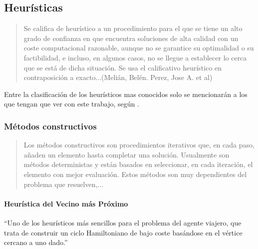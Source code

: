 \subsection{Heurísticas}  %
\begin{quote}Se califica de heurístico a un procedimiento para el que se tiene un alto grado de confianza en que encuentra soluciones de alta calidad con un coste computacional razonable, aunque no se garantice su optimalidad o su factibilidad, e incluso, en algunos casos, no se llegue a establecer lo cerca que se está de dicha situación. Se usa el calificativo heurístico en contraposición a exacto...(Melián, Belén. Perez, Jose A. et al) \cite{RiojasCanari2005BusquedaN-reinas}\end{quote}

Entre la clasificación de los heurísticos mas conocidos solo se mencionarán a los que tengan que ver con este trabajo, según .
\subsubsection{Métodos constructivos}
\begin{quote}Los métodos constructivos son procedimientos iterativos que, en cada paso, añaden un elemento hasta completar una solución. Usualmente son métodos deterministas y están basados en seleccionar, en cada iteración, el elemento con mejor evaluación. Estos métodos son muy dependientes del problema que resuelven,... \cite{MartiProcedimientosCombinatoria}\end{quote}
\paragraph{Heurística del Vecino más Próximo}
“Uno de los heurísticos más sencillos para el problema del agente viajero, que trata de construir un ciclo Hamiltoniano de bajo coste basándose en el vértice cercano a uno dado.” \cite{MartiProcedimientosCombinatoria}

